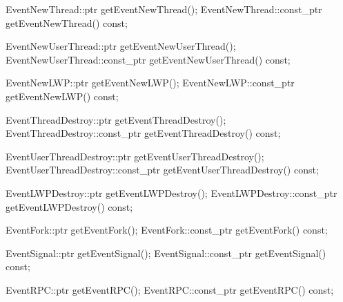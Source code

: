 \apidesc{
}

\begin{apient}
  EventNewThread::ptr getEventNewThread();
  EventNewThread::const_ptr getEventNewThread() const;
\end{apient}

\apidesc{
}

\begin{apient}
  EventNewUserThread::ptr getEventNewUserThread();
  EventNewUserThread::const_ptr getEventNewUserThread() const;
\end{apient}

\apidesc{
}

\begin{apient}
  EventNewLWP::ptr getEventNewLWP();
  EventNewLWP::const_ptr getEventNewLWP() const;
\end{apient}

\apidesc{
}

\begin{apient}
  EventThreadDestroy::ptr getEventThreadDestroy();
  EventThreadDestroy::const_ptr getEventThreadDestroy() const;
\end{apient}

\apidesc{
}

\begin{apient}
  EventUserThreadDestroy::ptr getEventUserThreadDestroy();
  EventUserThreadDestroy::const_ptr getEventUserThreadDestroy() const;
\end{apient}

\apidesc{
}

\begin{apient}
  EventLWPDestroy::ptr getEventLWPDestroy();
  EventLWPDestroy::const_ptr getEventLWPDestroy() const;
\end{apient}

\apidesc{
}

\begin{apient}
  EventFork::ptr getEventFork();
  EventFork::const_ptr getEventFork() const;
\end{apient}

\apidesc{
}

\begin{apient}
  EventSignal::ptr getEventSignal();
  EventSignal::const_ptr getEventSignal() const;
\end{apient}

\apidesc{
}

\begin{apient}
  EventRPC::ptr getEventRPC();
  EventRPC::const_ptr getEventRPC() const;
\end{apient}

